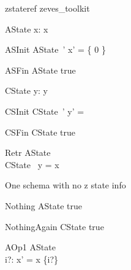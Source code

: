 
\begin{zsection}
   \SECTION zstateref \parents zeves\_toolkit
\end{zsection}

\begin{schema}{AState}
   x: \power \nat
\where
  x \neq \emptyset
\end{schema}

\begin{schema}{ASInit}
   AState~'
\where
   x' = \{ 0 \}
\end{schema}

\begin{schema}{ASFin}
   AState
\where
   true
\end{schema}

\begin{schema}{CState}
  y: \seq \nat
\where
   y \neq \langle \rangle
\end{schema}

\begin{schema}{CSInit}
   CState~'
\where
  y' =  \rangle
\end{schema}

\begin{schema}{CSFin}
   CState
\where
   true
\end{schema}

\begin{schema}{Retr}
   AState \\
   CState
\where
   \ran~y = x
\end{schema}

One schema with no z state info
\begin{schema}{Nothing}
   \Delta AState
\where
   true
\end{schema}

\begin{schema}{NothingAgain}
   \Delta CState
\where
   true
\end{schema}

\begin{schema}{AOp1}
   \Delta AState \\
   i?: \nat
\where
   x' = x \cup \{i?\}
\end{schema}

